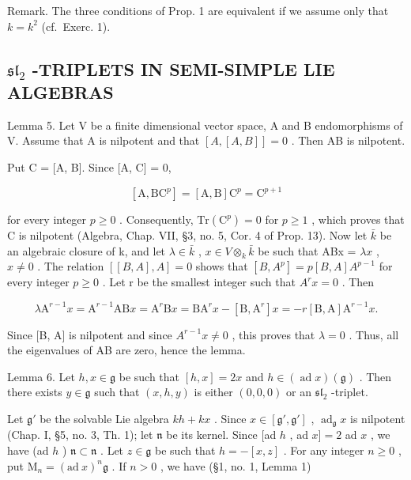 Remark. The three conditions of Prop. 1 are equivalent if we assume only that \(k = k^2\) (cf.~Exerc. 1).

\subsection{\texorpdfstring{\(\mathfrak{sl}_2\) -TRIPLETS IN SEMI-SIMPLE LIE ALGEBRAS}{\textbackslash mathfrak\{sl\}\_2 -TRIPLETS IN SEMI-SIMPLE LIE ALGEBRAS}}

Lemma 5. Let V be a finite dimensional vector space, A and B endomorphisms of V. Assume that A is nilpotent and that \([A, [A, B]] = 0\) . Then AB is nilpotent.

Put C = {[}A, B{]}. Since {[}A, C{]} = 0,

\[
[ \mathrm{A}, \mathrm{BC} ^ {p} ] = [ \mathrm{A}, \mathrm{B} ] \mathrm{C} ^ {p} = \mathrm{C} ^ {p + 1}
\]

for every integer \(p \geq 0\) . Consequently, \(\mathrm{Tr}(\mathrm{C}^{p}) = 0\) for \(p \geq 1\) , which proves that C is nilpotent (Algebra, Chap. VII, §3, no. 5, Cor. 4 of Prop. 13). Now let \(\bar{k}\) be an algebraic closure of k, and let \(\lambda \in \bar{k}\) , \(x \in V \otimes_{k} \bar{k}\) be such that ABx = \(\lambda x\) , \(x \neq 0\) . The relation \([[B, A], A] = 0\) shows that \([B, A^{p}] = p[B, A]A^{p-1}\) for every integer \(p \geq 0\) . Let r be the smallest integer such that \(A^{r}x = 0\) . Then

\[
\lambda \mathrm{A} ^ {r - 1} x = \mathrm{A} ^ {r - 1} \mathrm{AB} x = \mathrm{A} ^ {r} \mathrm{B} x = \mathrm{BA} ^ {r} x - [ \mathrm{B}, \mathrm{A} ^ {r} ] x = - r [ \mathrm{B}, \mathrm{A} ] \mathrm{A} ^ {r - 1} x.
\]

Since {[}B, A{]} is nilpotent and since \(A^{r-1}x \neq 0\) , this proves that \(\lambda = 0\) . Thus, all the eigenvalues of AB are zero, hence the lemma.

Lemma 6. Let \(h, x \in \mathfrak{g}\) be such that \([h, x] = 2x\) and \(h \in (\operatorname{ad} x)(\mathfrak{g})\) . Then there exists \(y \in \mathfrak{g}\) such that \((x, h, y)\) is either \((0, 0, 0)\) or an \(\mathfrak{sl}_2\) -triplet.

Let \(\mathfrak{g}'\) be the solvable Lie algebra \(kh + kx\) . Since \(x \in [\mathfrak{g}', \mathfrak{g}']\) , \(\operatorname{ad}_{\mathfrak{g}} x\) is nilpotent (Chap. I, §5, no. 3, Th. 1); let \(\mathfrak{n}\) be its kernel. Since {[}ad \(h\) , ad \(x] = 2\) ad \(x\) , we have (ad \(h\) ) \(\mathfrak{n} \subset \mathfrak{n}\) . Let \(z \in \mathfrak{g}\) be such that \(h = -[x, z]\) . For any integer \(n \geq 0\) , put \(\mathrm{M}_n = (\mathrm{ad}~x)^n\mathfrak{g}\) . If \(n > 0\) , we have (§1, no. 1, Lemma 1)

